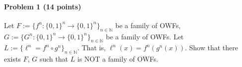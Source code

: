 \paragraph{Problem 1 (14 points)} 
Let $F:=\{ f^n: \{0,1\}^n \to \{0,1\}^{n}  \}_{n\in\mathbb{N}}$ be a family of OWFs,
$G:=\{ G^n: \{0,1\}^n \to \{0,1\}^{n}  \}_{n\in\mathbb{N}}$ be a family of OWFs. 
Let $L:= \{\ell^n = f^n \circ g^n\}_{n\in\mathbb{N}}$. That is, $\ell^n(x) = f^n( g^n(x) )$. 
Show that there exists $F$, $G$ such that $L$ is NOT a family of OWFs.